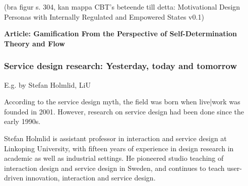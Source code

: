(bra figur s. 304, kan mappa CBT's beteende till detta: Motivational Design Personas with Internally Regulated and Empowered States v0.1)

\textbf{Article: Gamification From the Perspective of Self-Determination Theory and Flow}

\subsubsection{Service design research: Yesterday, today and tomorrow}

E.g. by Stefan Holmlid, LiU

According to the service design myth, the field was born when live|work was founded in 2001. However, research on service design had been done since the early 1990s.


Stefan Holmlid is assistant professor in interaction and service design at Linkoping University, with fifteen years of experience in design research in academic as well as industrial settings. He pioneered studio teaching of interaction design and service design in Sweden, and continues to teach user-driven innovation, interaction and service design.